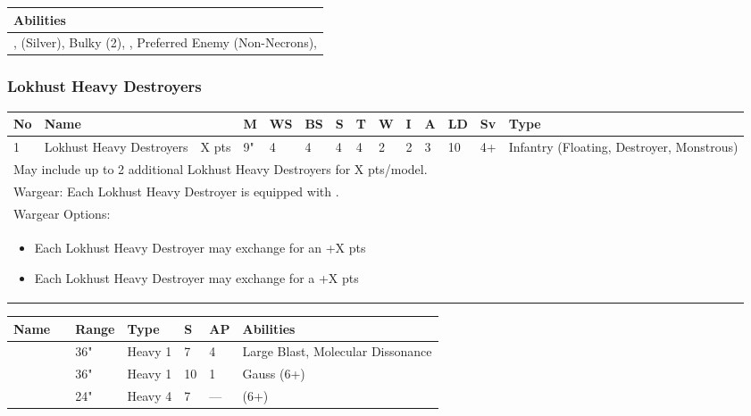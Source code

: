 \noindent
\begin{tabular}{||m{532pt}||}
	\hline
	Abilities \\
	\hline
	\quickref{Annihilation Protocols}, \quickref{Awakening Protocols} (Silver), Bulky (2), \quickref{Living Metal}, Preferred Enemy (Non-Necrons), \quickref{Reanimation Protocols} \\
	\hline
\end{tabular}


\newpage
\subsubsection{Lokhust Heavy Destroyers}

\noindent
\begin{tabular}{||m{10pt} m{95pt} m{30pt} m{11pt} m{11pt} m{11pt} m{11pt} m{11pt} m{11pt} m{11pt} m{11pt} m{11pt} m{11pt} m{125pt}||}
	\hline
	No & Name & & M & WS & BS & S & T & W & I & A & LD & Sv & Type \\
	\hline
	1 & Lokhust Heavy Destroyers & X pts & 9" & 4 & 4 & 4 & 4 & 2 & 2 & 3 & 10 & 4+ & Infantry (Floating, Destroyer, Monstrous) \\
	\hline
	\hline
	\multicolumn{14}{||Z{532 pt}||}{May include up to 2 additional Lokhust Heavy Destroyers for X pts/model.}\\	
	\hline
	\hline
	\multicolumn{14}{||Z{532 pt}||}{Wargear: Each Lokhust Heavy Destroyer is equipped with \quickref{Gauss Destructor}.} \\
	\multicolumn{14}{||Z{532 pt}||}{Wargear Options:} \\	\multicolumn{14}{||Z{532 pt}||}{\begin{itemize}
			\item Each Lokhust Heavy Destroyer may exchange \quickref{Gauss Destructor} for an \quickref{Enmitic Exterminator} \hrulefill +X pts
			\item Each Lokhust Heavy Destroyer may exchange \quickref{Gauss Destructor} for a \quickref{Tesla Destructor} \hrulefill +X pts
	\end{itemize}} \\
	\hline
\end{tabular}

\noindent
\begin{tabular}{||m{110pt} m{30pt} m{31pt} m{55pt} m{12pt} m{12pt} m{210pt}||}
	\hline
	Name & & Range & Type & S & AP & Abilities \\
	\hline
	\quickref{Enmitic Exterminator} &  & 36" & Heavy 1 & 7 & 4 & Large Blast, Molecular Dissonance \\
	\quickref{Gauss Destructor} &  & 36" & Heavy 1 & 10 & 1 &  Gauss (6+) \\
	\quickref{Tesla Destructor} &  & 24" & Heavy 4 & 7 & — &  \quickref{Tesla} (6+) \\
	\hline
\end{tabular}

